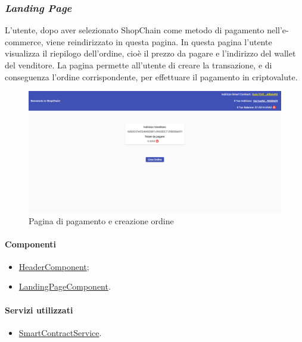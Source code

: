 \newpage

\subsubsection*{\textit{Landing Page}}
L'utente, dopo aver selezionato ShopChain come metodo di pagamento nell'e-commerce, viene reindirizzato in questa pagina. In questa pagina l'utente visualizza il riepilogo dell'ordine, cioè il prezzo da pagare e l'indirizzo del wallet del venditore. La pagina permette all'utente di creare la transazione, e di conseguenza l'ordine corrispondente, per effettuare il pagamento in criptovalute.

\begin{figure}[!h] 
    \centering 
    \includegraphics[width=1\columnwidth]{immagini/maschere/landingpage.png} 
    \caption{Pagina di pagamento e creazione ordine}
\end{figure}

\paragraph{Componenti}
\begin{itemize}
    \item \hyperref[sec:header-component]{HeaderComponent};
    \item \hyperref[sec:landing-component]{LandingPageComponent}.
\end{itemize}

\paragraph{Servizi utilizzati}
\begin{itemize}
    \item \hyperref[sec:smart-contract-service]{SmartContractService}.
\end{itemize}

